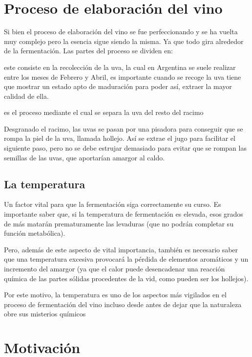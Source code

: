 \section{Proceso de elaboración del vino}
Si bien el proceso de elaboración del vino se fue perfeccionando y se ha vuelta muy complejo pero la esencia sigue siendo la misma. Ya que todo gira alrededor de la fermentación.
Las partes del proceso se dividen en:
\begin{description}
  \item[La vendimia o cosecha:] este consiste en la recolección de la uva, la cual en Argentina se suele realizar entre los meses de Febrero y Abril, es importante cuando se recoge la uva tiene que mostrar un estado apto de maduración para poder así, extraer la mayor calidad de ella.
  \item[Despalillado:] es el proceso mediante el cual se separa la uva del resto del racimo
  \item[Estrujado:] Desgranado el racimo, las uvas se pasan por una pisadora para conseguir que se rompa la piel de la uva, llamada hollejo. Así se extrae el jugo para facilitar el siguiente paso, pero no se debe estrujar demasiado para evitar que se rompan las semillas de las uvas, que aportarían amargor al caldo.
  \item 

\subsection{La temperatura}

  Un factor vital para que la fermentación siga correctamente su curso. Es importante saber que, si la temperatura de fermentación es elevada, esos grados de más matarán prematuramente las levaduras (que no podrán completar su función metabólica).

  Pero, además de este aspecto de vital importancia, también es necesario saber que una temperatura excesiva provocará la pérdida de elementos aromáticos y un incremento del amargor (ya que el calor puede desencadenar una reacción química de las partes sólidas procedentes de la vid, como pueden ser los hollejos).

  Por este motivo, la temperatura es uno de los aspectos más vigilados en el proceso de fermentación del vino incluso desde antes de dejar que la naturaleza obre sus misterios químicos


\section{Motivación}


\end{description}
